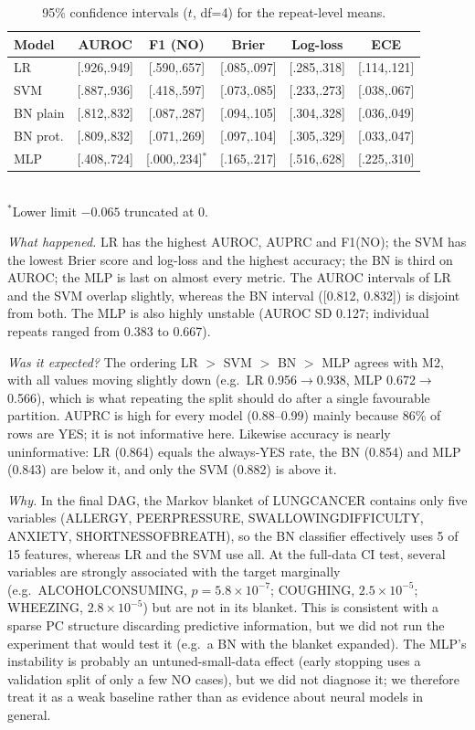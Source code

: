 \documentclass[10pt,twocolumn,letterpaper]{article}
\newcommand{\us}{\textunderscore\allowbreak}
\newcommand{\var}[1]{{\small\ttfamily\let\_\us #1}}
\newcommand{\tablesize}{\scriptsize}
\begin{document}
\begin{table}[!htbp]
\centering
\caption{95\% confidence intervals ($t$, df=4) for the repeat-level means.}
\label{tab:m3ci}
\tablesize
\setlength{\tabcolsep}{2.5pt}
\begin{tabular}{lccccc}
\toprule
Model & AUROC & F1 (NO) & Brier & Log-loss & ECE \\
\midrule
LR & [.926,.949] & [.590,.657] & [.085,.097] & [.285,.318] & [.114,.121] \\
SVM & [.887,.936] & [.418,.597] & [.073,.085] & [.233,.273] & [.038,.067] \\
BN plain & [.812,.832] & [.087,.287] & [.094,.105] & [.304,.328] & [.036,.049] \\
BN prot. & [.809,.832] & [.071,.269] & [.097,.104] & [.305,.329] & [.033,.047] \\
MLP & [.408,.724] & [.000,.234]$^*$ & [.165,.217] & [.516,.628] & [.225,.310] \\
\bottomrule
\end{tabular}
\\[2pt]{\scriptsize $^*$Lower limit $-0.065$ truncated at 0.}
\end{table}

\emph{What happened.} LR has the highest AUROC, AUPRC and F1(NO); the SVM has the lowest Brier score and log-loss and the highest accuracy; the BN is third on AUROC; the MLP is last on almost every metric. The AUROC intervals of LR and the SVM overlap slightly, whereas the BN interval ([0.812, 0.832]) is disjoint from both. The MLP is also highly unstable (AUROC SD 0.127; individual repeats ranged from 0.383 to 0.667).

\emph{Was it expected?} The ordering LR $>$ SVM $>$ BN $>$ MLP agrees with M2, with all values moving slightly down (e.g.\ LR 0.956$\to$0.938, MLP 0.672$\to$0.566), which is what repeating the split should do after a single favourable partition. AUPRC is high for every model (0.88--0.99) mainly because 86\% of rows are YES; it is not informative here. Likewise accuracy is nearly uninformative: LR (0.864) equals the always-YES rate, the BN (0.854) and MLP (0.843) are below it, and only the SVM (0.882) is above it.

\emph{Why.} In the final DAG, the Markov blanket of \var{LUNG\_CANCER} contains only five variables (\var{ALLERGY}, \var{PEER\_PRESSURE}, \var{SWALLOWING\_DIFFICULTY}, \var{ANXIETY}, \var{SHORTNESS\_OF\_BREATH}), so the BN classifier effectively uses 5 of 15 features, whereas LR and the SVM use all. At the full-data CI test, several variables are strongly associated with the target marginally (e.g.\ \var{ALCOHOL\_CONSUMING}, $p=5.8\times10^{-7}$; \var{COUGHING}, $2.5\times10^{-5}$; \var{WHEEZING}, $2.8\times10^{-5}$) but are not in its blanket. This is consistent with a sparse PC structure discarding predictive information, but we did not run the experiment that would test it (e.g.\ a BN with the blanket expanded). The MLP's instability is probably an untuned-small-data effect (early stopping uses a validation split of only a few NO cases), but we did not diagnose it; we therefore treat it as a weak baseline rather than as evidence about neural models in general.
\end{document}
